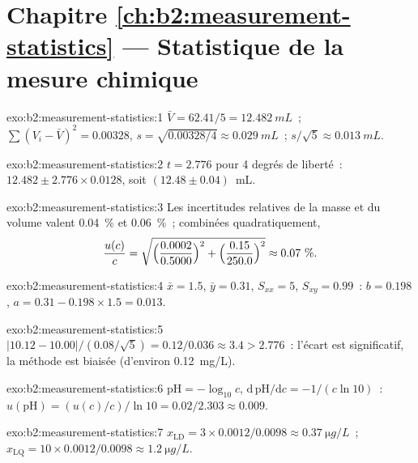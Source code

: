 \section*{Chapitre \ref{ch:b2:measurement-statistics} --- Statistique de la mesure chimique}

\begin{solution}{exo:b2:measurement-statistics:1}
$\bar V = 62.41/5 = \qty{12.482}{mL}$~; $\sum(V_i - \bar V)^2 = 0.00328$, $s = \sqrt{0.00328/4} \approx
\qty{0.029}{mL}$~; $s/\sqrt5 \approx \qty{0.013}{mL}$.
\end{solution}

\begin{solution}{exo:b2:measurement-statistics:2}
$t = 2.776$ pour 4 degrés de liberté~: $12.482 \pm 2.776 \times 0.0128$, soit $(12.48 \pm 0.04)$~mL.
\end{solution}

\begin{solution}{exo:b2:measurement-statistics:3}
Les incertitudes relatives de la masse et du volume valent 0.04~\% et 0.06~\%~; combinées
quadratiquement,
\[\frac{u(c)}{c} = \sqrt{\Bigl(\frac{0.0002}{0.5000}\Bigr)^2 + \Bigl(\frac{0.15}{250.0}\Bigr)^2}
\approx 0.07~\%.\]
\end{solution}

\begin{solution}{exo:b2:measurement-statistics:4}
$\bar x = 1.5$, $\bar y = 0.31$, $S_{xx} = 5$, $S_{xy} = 0.99$~: $b = 0.198$, $a = 0.31 - 0.198 \times 1.5
= 0.013$.
\end{solution}

\begin{solution}{exo:b2:measurement-statistics:5}
$|10.12 - 10.00|/(0.08/\sqrt5) = 0.12/0.036 \approx 3.4 > 2.776$~: l'écart est significatif, la
méthode est biaisée (d'environ \qty{+0.12}{mg/L}).
\end{solution}

\begin{solution}{exo:b2:measurement-statistics:6}
$\mathrm{pH} = -\log_{10}c$, $\mathrm d\,\mathrm{pH}/\mathrm dc = -1/(c\ln10)$~:
$u(\mathrm{pH}) = (u(c)/c)/\ln10 = 0.02/2.303 \approx 0.009$.
\end{solution}

\begin{solution}{exo:b2:measurement-statistics:7}
$x_{\mathrm{LD}} = 3 \times 0.0012/0.0098 \approx \qty{0.37}{\micro g/L}$~; $x_{\mathrm{LQ}} = 10
\times 0.0012/0.0098 \approx \qty{1.2}{\micro g/L}$.
\end{solution}

